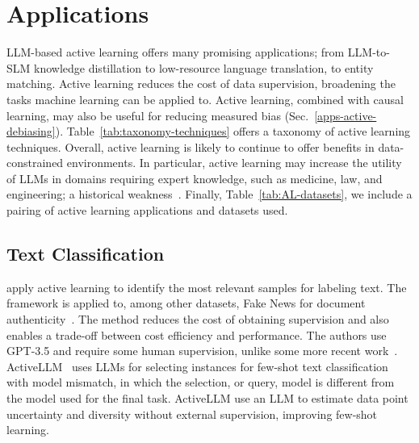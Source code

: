\section{Applications } \label{app:apps}
LLM-based active learning offers many promising applications; from LLM-to-SLM knowledge distillation  to low-resource language translation, to entity matching. Active learning reduces the cost of data supervision, broadening the tasks machine learning can be applied to. Active learning, combined with causal learning, may also be useful for reducing measured bias (Sec.~\ref{apps-active-debiasing}).
Table~\ref{tab:taxonomy-techniques} offers a taxonomy of active learning techniques. 
Overall, active learning is likely to continue to offer benefits in data-constrained environments. 
In particular, active learning may increase the utility of LLMs in domains requiring expert knowledge, such as medicine, law, and engineering; a historical weakness~\cite{yao2023beyond}. Finally, Table~\ref{tab:AL-datasets}, we include a pairing of active learning applications and datasets used.






\subsection{Text Classification}\label{apps-text-classification}

\citet{rouzegar2024enhancing} apply active learning to identify the most relevant samples for labeling text. The framework is applied to, among other datasets, Fake News for document authenticity~\cite{avrv-tp46-24}. The method reduces the cost of obtaining supervision and also enables a trade-off between cost efficiency and performance. The authors use GPT-3.5 and require some human supervision, unlike some more recent work~\cite{du2024causal}. 
ActiveLLM~\cite{bayer2024activellm} uses LLMs for selecting instances for few-shot text classification with model mismatch, in which the selection, or query, model is different from the model used for the final task. ActiveLLM use an LLM to estimate data point uncertainty and diversity without external supervision, improving few-shot learning.



